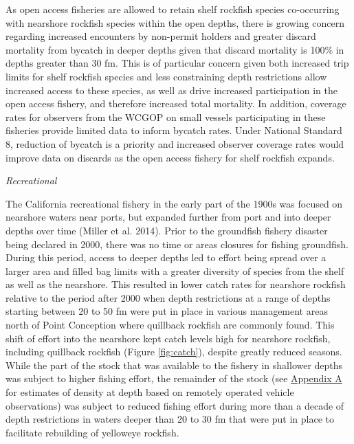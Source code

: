 \documentclass[11pt,
  english,
  a4paper,
]{article}
\begin{document}
\leavevmode\tagmcend\tagstructend\par


As open access fisheries are allowed to retain shelf rockfish species co-occurring with nearshore rockfish species within the open depths, there is growing concern regarding increased encounters by non-permit holders and greater discard mortality from bycatch in deeper depths given that discard mortality is 100\% in depths greater than 30 fm. This is of particular concern given both increased trip limits for shelf rockfish species and less constraining depth restrictions allow increased access to these species, as well as drive increased participation in the open access fishery, and therefore increased total mortality. In addition, coverage rates for observers from the WCGOP on small vessels participating in these fisheries provide limited data to inform bycatch rates. Under National Standard 8, reduction of bycatch is a priority and increased observer coverage rates would improve data on discards as the open access fishery for shelf rockfish expands.

\leavevmode\tagmcend\tagstructend\par


\emph{Recreational}

\leavevmode\tagmcend\tagstructend\par


The California recreational fishery in the early part of the 1900s was focused on nearshore waters near ports, but expanded further from port and into deeper depths over time {(Miller et al. 2014)\leavevmode\tagmcend\tagstructend}. Prior to the groundfish fishery disaster being declared in 2000, there was no time or areas closures for fishing groundfish. During this period, access to deeper depths led to effort being spread over a larger area and filled bag limits with a greater diversity of species from the shelf as well as the nearshore. This resulted in lower catch rates for nearshore rockfish relative to the period after 2000 when depth restrictions at a range of depths starting between 20 to 50 fm were put in place in various management areas north of Point Conception where quillback rockfish are commonly found. This shift of effort into the nearshore kept catch levels high for nearshore rockfish, including quillback rockfish (Figure \ref{fig:catch}), despite greatly reduced seasons. While the part of the stock that was available to the fishery in shallower depths was subject to higher fishing effort, the remainder of the stock (see {\protect\hyperlink{append_a}{Appendix A}\leavevmode\tagmcend\tagstructend} for estimates of density at depth based on remotely operated vehicle observations) was subject to reduced fishing effort during more than a decade of depth restrictions in waters deeper than 20 to 30 fm that were put in place to facilitate rebuilding of yelloweye rockfish.
\end{document}

